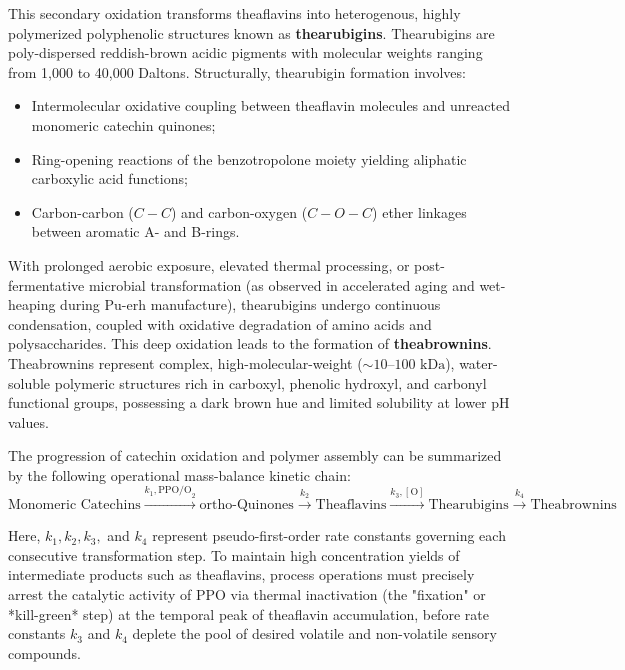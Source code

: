 \documentclass{article}
\begin{document}
This secondary oxidation transforms theaflavins into heterogenous, highly polymerized polyphenolic structures known as \textbf{thearubigins}. Thearubigins are poly-dispersed reddish-brown acidic pigments with molecular weights ranging from 1,000 to 40,000 Daltons. Structurally, thearubigin formation involves:
\begin{itemize}
    \item Intermolecular oxidative coupling between theaflavin molecules and unreacted monomeric catechin quinones;
    \item Ring-opening reactions of the benzotropolone moiety yielding aliphatic carboxylic acid functions;
    \item Carbon-carbon ($C-C$) and carbon-oxygen ($C-O-C$) ether linkages between aromatic A- and B-rings.
\end{itemize}

With prolonged aerobic exposure, elevated thermal processing, or post-fermentative microbial transformation (as observed in accelerated aging and wet-heaping during Pu-erh manufacture), thearubigins undergo continuous condensation, coupled with oxidative degradation of amino acids and polysaccharides. This deep oxidation leads to the formation of \textbf{theabrownins}. Theabrownins represent complex, high-molecular-weight ($\sim 10\text{--}100\text{ kDa}$), water-soluble polymeric structures rich in carboxyl, phenolic hydroxyl, and carbonyl functional groups, possessing a dark brown hue and limited solubility at lower pH values.

The progression of catechin oxidation and polymer assembly can be summarized by the following operational mass-balance kinetic chain:
\begin{equation}
\text{Monomeric Catechins} \xrightarrow{k_1, \text{PPO/O}_2} \text{ortho-Quinones} \xrightarrow{k_2} \text{Theaflavins} \xrightarrow{k_3, [\text{O}]} \text{Thearubigins} \xrightarrow{k_4} \text{Theabrownins}
\end{equation}

Here, $k_1, k_2, k_3,$ and $k_4$ represent pseudo-first-order rate constants governing each consecutive transformation step. To maintain high concentration yields of intermediate products such as theaflavins, process operations must precisely arrest the catalytic activity of PPO via thermal inactivation (the "fixation" or *kill-green* step) at the temporal peak of theaflavin accumulation, before rate constants $k_3$ and $k_4$ deplete the pool of desired volatile and non-volatile sensory compounds.
\end{document}
